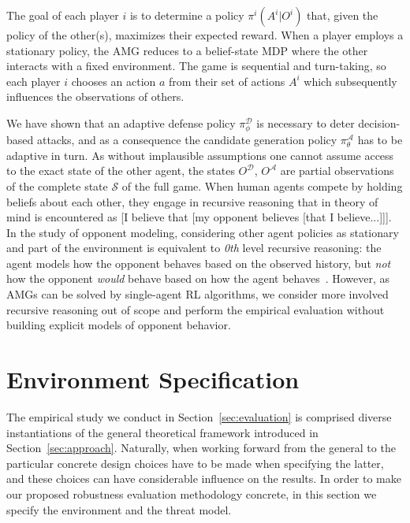 The goal of each player $i$ is to determine a policy $\pi^{i}(A^i | O^i)$ that, given the policy of the other(s), maximizes their expected reward.
When a player employs a stationary policy, the AMG reduces to a belief-state MDP where the other interacts with a fixed environment.
The game is sequential and turn-taking, so each player $i$ chooses an action $a$ from their set of actions $A^i$ which subsequently influences the observations of others.

We have shown that an adaptive defense policy $\pi^{\mathcal{D}}_\phi$ is necessary to deter decision-based attacks, and as a consequence the candidate generation policy $\pi^{\mathcal{A}}_\theta$ has to be adaptive in turn.
As without implausible assumptions one cannot assume access to the exact state of the other agent, the states $O^{\mathcal{D}}$, $O^{\mathcal{A}}$ are partial observations of the complete state $\mathcal{S}$ of the full game.
When human agents compete by holding beliefs about each other, they engage in recursive reasoning that in theory of mind is encountered as [I believe that [my opponent believes [that I believe...]]].
In the study of opponent modeling, considering other agent policies as stationary and part of the environment is equivalent to \textit{0th} level recursive reasoning:
the agent models how the opponent behaves based on the observed history, but \emph{not} how the opponent \emph{would} behave based on how the agent behaves~\cite{albrecht2018autonomous, wen2019probabilistic}.
However, as AMGs can be solved by single-agent RL algorithms, we consider more involved recursive reasoning out of scope and perform the empirical evaluation without building explicit models of opponent behavior.

\section{Environment Specification}
\label{sec:threat}

The empirical study we conduct in Section~\ref{sec:evaluation} is comprised diverse instantiations of the general theoretical framework introduced in Section~\ref{sec:approach}.
Naturally, when working forward from the general to the particular concrete design choices have to be made when specifying the latter, and these choices can have considerable influence on the results.
In order to make our proposed robustness evaluation methodology concrete, in this section we specify the environment and the threat model.

